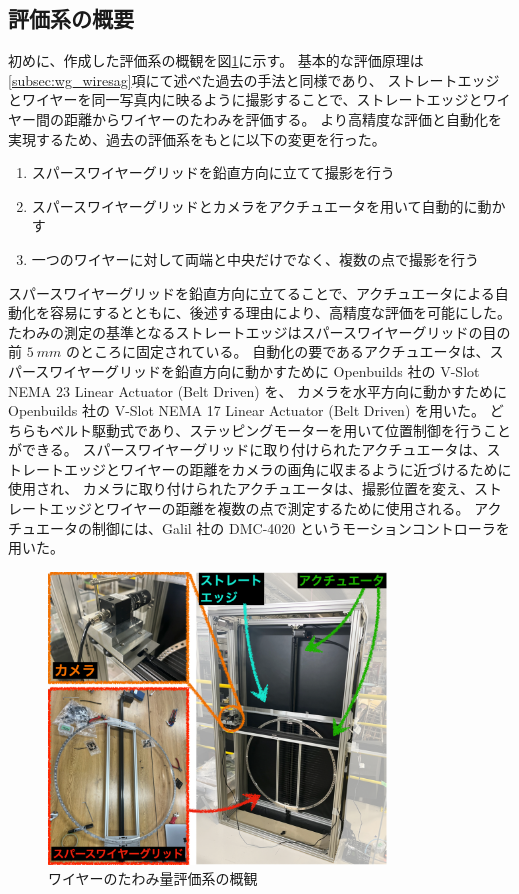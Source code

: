 \documentclass[../../main.tex]{subfiles}
\begin{document}
\subsection{評価系の概要}
初めに、作成した評価系の概観を図\ref{fig:wiresag_system}に示す。
基本的な評価原理は\ref{subsec:wg_wiresag}項にて述べた過去の手法と同様であり、
ストレートエッジとワイヤーを同一写真内に映るように撮影することで、ストレートエッジとワイヤー間の距離からワイヤーのたわみを評価する。
より高精度な評価と自動化を実現するため、過去の評価系をもとに以下の変更を行った。
\begin{enumerate}
    \item スパースワイヤーグリッドを鉛直方向に立てて撮影を行う
    \item スパースワイヤーグリッドとカメラをアクチュエータを用いて自動的に動かす
    \item 一つのワイヤーに対して両端と中央だけでなく、複数の点で撮影を行う
\end{enumerate}

スパースワイヤーグリッドを鉛直方向に立てることで、アクチュエータによる自動化を容易にするとともに、後述する理由により、高精度な評価を可能にした。
たわみの測定の基準となるストレートエッジはスパースワイヤーグリッドの目の前 $\SI{5}{mm}$ のところに固定されている。
自動化の要であるアクチュエータは、スパースワイヤーグリッドを鉛直方向に動かすために Openbuilds 社の V-Slot NEMA 23 Linear Actuator (Belt Driven) を、
カメラを水平方向に動かすために Openbuilds 社の V-Slot NEMA 17 Linear Actuator (Belt Driven) を用いた。
どちらもベルト駆動式であり、ステッピングモーターを用いて位置制御を行うことができる。
スパースワイヤーグリッドに取り付けられたアクチュエータは、ストレートエッジとワイヤーの距離をカメラの画角に収まるように近づけるために使用され、
カメラに取り付けられたアクチュエータは、撮影位置を変え、ストレートエッジとワイヤーの距離を複数の点で測定するために使用される。
アクチュエータの制御には、Galil 社の DMC-4020 というモーションコントローラを用いた。

\begin{figure}[H]
    \centering
    \includegraphics[width=0.8\textwidth]{wiresag/wiresag_system.pdf}
    \caption{ワイヤーのたわみ量評価系の概観}
    \label{fig:wiresag_system}
\end{figure}
\end{document}
